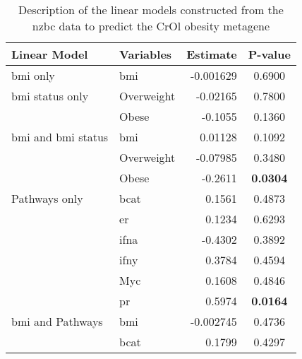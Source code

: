 	\begin{table}[htpb]
		\centering
		\caption{Description of the linear models constructed from the \gls{nzbc} data to predict the CrOl obesity metagene}
		\label{tab:lm_sig_var_crol}
		\begin{threeparttable}
			\begin{tabular}{llrc}
				Linear Model & Variables & Estimate & P-value\\
				\hline
				\hline
				\rule{0pt}{2.25ex}\gls{bmi} only                           & \gls{bmi}  & -0.001629 & 0.6900 \\
				\hline
				\rule{0pt}{2.25ex}\gls{bmi} status only                    & Overweight & -0.02165  & 0.7800 \\
                                                                           & Obese      & -0.1055   & 0.1360 \\
				\hline
				\rule{0pt}{2.25ex}\gls{bmi} and \gls{bmi} status           & \gls{bmi}  & 0.01128   & 0.1092 \\
                                                                           & Overweight & -0.07985  & 0.3480 \\
                                                                           & Obese      & -0.2611   & \bfseries 0.0304  \\
				\hline
				\rule{0pt}{2.25ex}Pathways only                            & \gls{bcat} & 0.1561    & 0.4873 \\
                                                                           & \gls{er}   & 0.1234    & 0.6293 \\
                                                                           & \gls{ifna} & -0.4302   & 0.3892 \\
                                                                           & \gls{ifny} & 0.3784    & 0.4594 \\
                                                                           & Myc        & 0.1608    & 0.4846 \\
                                                                           & \gls{pr}   & 0.5974    & \bfseries 0.0164  \\
				\hline
				\rule{0pt}{2.25ex}\gls{bmi} and Pathways                   & \gls{bmi}  & -0.002745 & 0.4736 \\
                                                                           & \gls{bcat} & 0.1799    & 0.4297 \\

\end{tabular}
\end{threeparttable}
\end{table}
